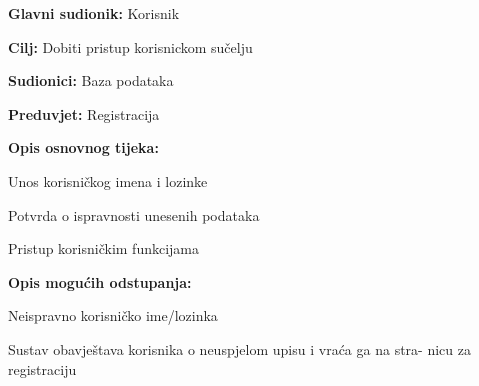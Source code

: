 					\noindent {}
					\begin{packed_item}
	
						\item \textbf{Glavni sudionik: } Korisnik
						\item  \textbf{Cilj:} Dobiti pristup korisnickom sučelju
						\item  \textbf{Sudionici:} Baza podataka
						\item  \textbf{Preduvjet:} Registracija
						\item  \textbf{Opis osnovnog tijeka:}
						
						\item[] \begin{packed_enum}
	
							\item Unos korisničkog imena i lozinke
							\item Potvrda o ispravnosti unesenih podataka
							\item Pristup korisničkim funkcijama
						\end{packed_enum}
						
						\item  \textbf{Opis mogućih odstupanja:}
						
						\item[] \begin{packed_item}
	
							\item[2.a] Neispravno korisničko ime/lozinka
							\item[] \begin{packed_enum}
								
								\item Sustav obavještava korisnika o neuspjelom upisu i vraća ga na stra- 
								nicu za registraciju
								
								
							\end{packed_enum}
							
						\end{packed_item}
					\end{packed_item}
					
